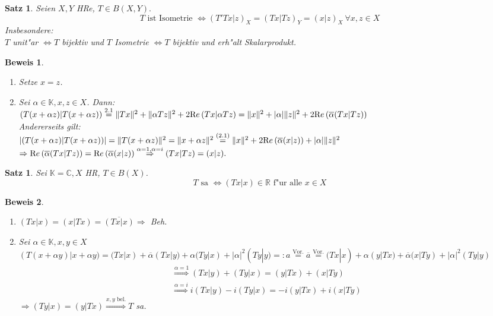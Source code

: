 \documentclass[a4paper,11pt]{book}
\newcommand{\R}{{\mathbb R}}
\newcommand{\C}{{\mathbb C}}
\newcommand{\K}{{\mathbb K}}
\newcommand{\re}{\ensuremath{\text Re}\,} %
\newtheorem{Sa}[Def]{Satz}
\theoremstyle{nonumberplain}
\newtheorem{Bew}{Beweis}
\begin{document}
\begin{Sa}
Seien $X,Y$ HRe, $T \in B(X,Y).$
\[
T \text{ ist Isometrie } \Longleftrightarrow (T'Tx|z)_X = (Tx|Tz)_Y = (x|z)_X \ \forall x,z \in X
\]
Insbesondere:\\
$T$ unit"ar $\Leftrightarrow T$ bijektiv und $T$ Isometrie $\Leftrightarrow T$ bijektiv und erh"alt Skalarprodukt.
\end{Sa}

\begin{Bew}
\begin{enumerate}
\item["` $\Leftarrow$ "'] Setze $x = z$.

\item["` $\Rightarrow$ "'] Sei $\alpha \in \K, x,z \in X$. Dann:\\
$(T(x+\alpha z)|T(x+\alpha z)) \stackrel{2.1}{=} \|Tx\|^2 + \|\alpha Tz\|^2 + 2 \re (Tx|\alpha Tz) = \|x\|^2 + |\alpha| \|z\|^2 + 2 \re (\overline{\alpha}(Tx|Tz))$\\
Andererseits gilt:\\
$|(T(x+\alpha z)|T(x+\alpha z))| = \|T(x+\alpha z)\|^2 = \|x+\alpha z\|^2 \stackrel{(2.1)}{=} \|x\|^2 + 2 \re (\overline{\alpha}(x|z)) + |\alpha| \|z\|^2$\\
$\Rightarrow \re(\overline{\alpha}(Tx|Tz)) = \re(\overline{\alpha}(x|z)) \stackrel{\alpha=1,\alpha=i}{\Rightarrow} (Tx|Tz) = (x|z).$
\end{enumerate}
\end{Bew}


\begin{Sa}
Sei $\K = \C, X$ HR, $T \in B(X)$.
\[
T \text{ sa } \Leftrightarrow (Tx|x) \in \R \text{ f"ur alle } x \in X
\]
\end{Sa}

\begin{Bew}
\begin{enumerate}
\item["` $\Rightarrow$ "'] $(Tx|x) = (x|Tx) = \overline{(Tx|x)} \Rightarrow$ Beh.

\item["` $\Leftarrow$ "'] Sei $\alpha \in \K, x,y \in X$\\
$(T(x+\alpha y)|x+\alpha y) = (Tx|x) + \overline{\alpha} (Tx|y) + \alpha (Ty|x) + |\alpha|^2(Ty|y) =: a \stackrel{\text{Vor.}}{=} \overline{a} \stackrel{\text{Vor.}}{=} (Tx|x) + \alpha(y|Tx) + \overline{\alpha}(x|Ty) + |\alpha|^2(Ty|y)$
\begin{eqnarray}
\stackrel{\alpha = 1}{\Rightarrow} (Tx|y) + (Ty|x) = (y|Tx) + (x|Ty) \\
\stackrel{\alpha = i}{\Rightarrow} i(Tx|y) - i(Ty|x) = -i(y|Tx) + i(x|Ty)
\end{eqnarray}
$\Rightarrow (Ty|x) = (y|Tx) \stackrel{x,y \text{ bel.}}{\Rightarrow} T$ sa.
\end{enumerate}
\end{Bew}
\end{document}
